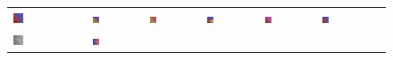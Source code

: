 \begin{figure}[h!]
\begin{tabular}{C{0.14\textwidth}C{0.14\textwidth}C{0.14\textwidth}C{0.14\textwidth}C{0.14\textwidth}C{0.14\textwidth}C{0.14\textwidth}}
		\includegraphics[width=0.14\textwidth]{images/gen/filter_size/p03_02.png_0.25.png} &
		\includegraphics[width=0.14\textwidth]{images/gen/filter_size/p03_02.png_0.50.png} &
		\includegraphics[width=0.14\textwidth]{images/gen/filter_size/p03_02.png_0.75.png} &
		\includegraphics[width=0.14\textwidth]{images/gen/filter_size/p03_02.png_1.00.png} &
		\includegraphics[width=0.14\textwidth]{images/gen/filter_size/p03_02.png_1.25.png} &
		\includegraphics[width=0.14\textwidth]{images/gen/filter_size/p03_02.png_1.50.png} \\
		\includegraphics[width=0.14\textwidth]{images/p03/p03_03.png} &
		\includegraphics[width=0.14\textwidth]{images/gen/filter_size/p03_03.png_0.25.png} &

\end{tabular}
\end{figure}
